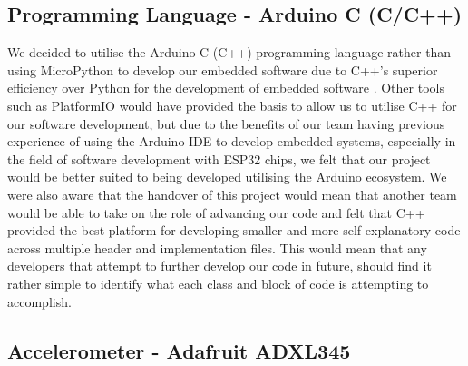         \subsection{Programming Language - Arduino C (C/C++)}
        \label{subsec:programming_language}

            We decided to utilise the Arduino C (C++) programming language rather than using MicroPython to develop our embedded software due to C++'s superior efficiency over Python for the development of embedded software \cite{github_2014, dicola}. Other tools such as PlatformIO would have provided the basis to allow us to utilise C++ for our software development, but due to the benefits of our team having previous experience of using the Arduino IDE to develop embedded systems, especially in the field of software development with ESP32 chips, we felt that our project would be better suited to being developed utilising the Arduino ecosystem. We were also aware that the handover of this project would mean that another team would be able to take on the role of advancing our code and felt that C++ provided the best platform for developing smaller and more self-explanatory code across multiple header and implementation files. This would mean that any developers that attempt to further develop our code in future, should find it rather simple to identify what each class and block of code is attempting to accomplish.

        \subsection{Accelerometer - Adafruit ADXL345}
        \label{subsec:accel}

